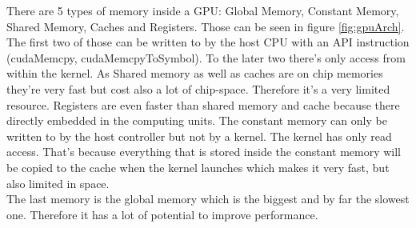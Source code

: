 There are 5 types of memory inside a GPU: Global Memory, Constant Memory, Shared Memory, Caches and Registers. Those can be seen in figure \ref{fig:gpuArch}. The first two of those can be written to by the host CPU with an API instruction (cudaMemcpy, cudaMemcpyToSymbol). To the later two there's only access from within the kernel. As Shared memory as well as caches are on chip memories they're very fast but cost also a lot of chip-space. Therefore it's a very limited resource. Registers are even faster than shared memory and cache because there directly embedded in the computing units. The constant memory can only be written to by the host controller but not by a kernel. The kernel has only read access. That's because everything that is stored inside the constant memory will be copied to the cache when the kernel launches which makes it very fast, but also limited in space.\\
The last memory is the global memory which is the biggest and by far the slowest one. Therefore it has a lot of potential to improve performance.\\

